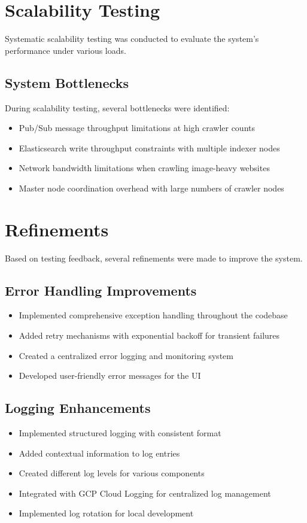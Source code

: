 \documentclass[12pt,a4paper]{report}
\begin{document}
\section{Scalability Testing}
Systematic scalability testing was conducted to evaluate the system's performance under various loads.

\subsection{System Bottlenecks}
During scalability testing, several bottlenecks were identified:
\begin{itemize}
    \item Pub/Sub message throughput limitations at high crawler counts
    \item Elasticsearch write throughput constraints with multiple indexer nodes
    \item Network bandwidth limitations when crawling image-heavy websites
    \item Master node coordination overhead with large numbers of crawler nodes
\end{itemize}


\section{Refinements}
Based on testing feedback, several refinements were made to improve the system.

\subsection{Error Handling Improvements}
\begin{itemize}
    \item Implemented comprehensive exception handling throughout the codebase
    \item Added retry mechanisms with exponential backoff for transient failures
    \item Created a centralized error logging and monitoring system
    \item Developed user-friendly error messages for the UI
\end{itemize}

\subsection{Logging Enhancements}
\begin{itemize}
    \item Implemented structured logging with consistent format
    \item Added contextual information to log entries
    \item Created different log levels for various components
    \item Integrated with GCP Cloud Logging for centralized log management
    \item Implemented log rotation for local development
\end{itemize}
\end{document}
